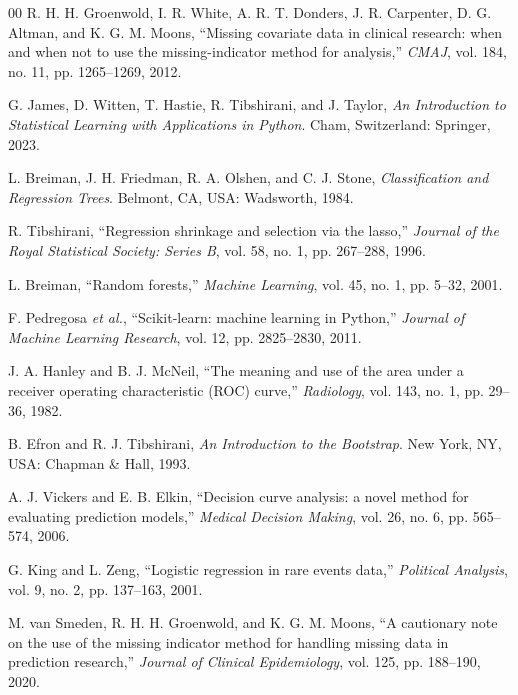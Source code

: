 \documentclass[conference]{IEEEtran}
\begin{document}
\begin{thebibliography}{00}
 R. H. H. Groenwold, I. R. White, A. R. T. Donders, J. R. Carpenter, D. G. Altman, and K. G. M. Moons, ``Missing covariate data in clinical research: when and when not to use the missing-indicator method for analysis,'' \textit{CMAJ}, vol. 184, no. 11, pp. 1265--1269, 2012.

 G. James, D. Witten, T. Hastie, R. Tibshirani, and J. Taylor, \textit{An Introduction to Statistical Learning with Applications in Python}. Cham, Switzerland: Springer, 2023.

 L. Breiman, J. H. Friedman, R. A. Olshen, and C. J. Stone, \textit{Classification and Regression Trees}. Belmont, CA, USA: Wadsworth, 1984.

 R. Tibshirani, ``Regression shrinkage and selection via the lasso,'' \textit{Journal of the Royal Statistical Society: Series B}, vol. 58, no. 1, pp. 267--288, 1996.

 L. Breiman, ``Random forests,'' \textit{Machine Learning}, vol. 45, no. 1, pp. 5--32, 2001.

 F. Pedregosa \textit{et al.}, ``Scikit-learn: machine learning in Python,'' \textit{Journal of Machine Learning Research}, vol. 12, pp. 2825--2830, 2011.

 J. A. Hanley and B. J. McNeil, ``The meaning and use of the area under a receiver operating characteristic (ROC) curve,'' \textit{Radiology}, vol. 143, no. 1, pp. 29--36, 1982.

 B. Efron and R. J. Tibshirani, \textit{An Introduction to the Bootstrap}. New York, NY, USA: Chapman \& Hall, 1993.

 A. J. Vickers and E. B. Elkin, ``Decision curve analysis: a novel method for evaluating prediction models,'' \textit{Medical Decision Making}, vol. 26, no. 6, pp. 565--574, 2006.

 G. King and L. Zeng, ``Logistic regression in rare events data,'' \textit{Political Analysis}, vol. 9, no. 2, pp. 137--163, 2001.

 M. van Smeden, R. H. H. Groenwold, and K. G. M. Moons, ``A cautionary note on the use of the missing indicator method for handling missing data in prediction research,'' \textit{Journal of Clinical Epidemiology}, vol. 125, pp. 188--190, 2020.

\end{thebibliography}
\end{document}
